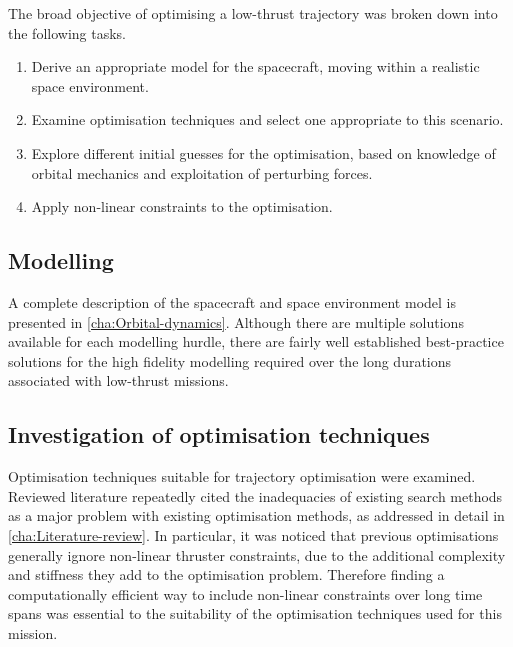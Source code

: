 The broad objective of optimising a low-thrust trajectory was broken down into the following tasks.

\begin{enumerate}
  \item Derive an appropriate model for the spacecraft, moving within a realistic space environment.
  \item Examine optimisation techniques and select one appropriate to this scenario.
  \item Explore different initial guesses for the optimisation, based on knowledge of orbital mechanics and exploitation of perturbing forces.
  \item Apply non-linear constraints to the optimisation.
\end{enumerate}

\subsection{Modelling} \label{sub:Modelling-task}

A complete description of the spacecraft and space environment model is presented in \autoref{cha:Orbital-dynamics}. Although there are multiple solutions available for each modelling hurdle, there are fairly well established best-practice solutions for the high fidelity modelling required over the long durations associated with low-thrust missions.

\subsection{Investigation of optimisation techniques} \label{sub:Optimisation-techniques}

Optimisation techniques suitable for trajectory optimisation were examined. Reviewed literature repeatedly cited the inadequacies of existing search methods as a major problem with existing optimisation methods, as addressed in detail in \autoref{cha:Literature-review}. In particular, it was noticed that previous optimisations generally ignore non-linear thruster constraints, due to the additional complexity and stiffness they add to the optimisation problem. Therefore finding a computationally efficient way to include non-linear constraints over long time spans was essential to the suitability of the optimisation techniques used for this mission.
 

